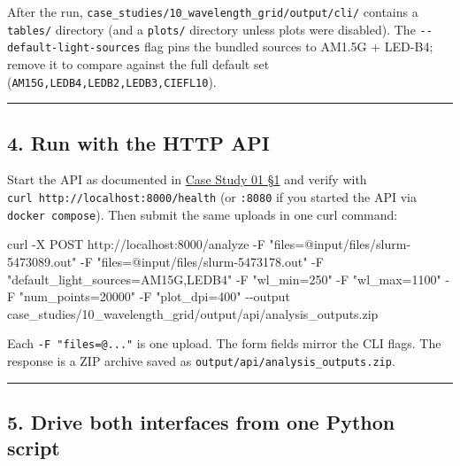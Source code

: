 \documentclass[
  11pt,
]{article}
\newenvironment{Shaded}{}{}
\newcommand{\AttributeTok}[1]{\textcolor[rgb]{0.49,0.56,0.16}{#1}}
\newcommand{\ExtensionTok}[1]{#1}
\newcommand{\NormalTok}[1]{#1}
\newcommand{\StringTok}[1]{\textcolor[rgb]{0.25,0.44,0.63}{#1}}
\begin{document}
After the run, \texttt{case\_studies/10\_wavelength\_grid/output/cli/}
contains a \texttt{tables/} directory (and a \texttt{plots/} directory
unless plots were disabled). The \texttt{-\/-default-light-sources} flag
pins the bundled sources to AM1.5G + LED-B4; remove it to compare
against the full default set (\texttt{AM15G,LEDB4,LEDB2,LEDB3,CIEFL10}).

\begin{center}\rule{0.5\linewidth}{0.5pt}\end{center}

\hypertarget{4-run-with-the-http-api}{
\subsection{4. Run with the HTTP API}\label{4-run-with-the-http-api}}

Start the API as documented in
\href{https://github.com/pinarsyt/overlap-calculator/blob/main/case_studies/01_theoretical_only/README.md\#1-prerequisites}{Case
Study 01 §1} and verify with
\texttt{curl\ http://localhost:8000/health} (or \texttt{:8080} if you
started the API via \texttt{docker\ compose}). Then submit the same
uploads in one curl command:

\begin{Shaded}
\begin{Highlighting}[]
\ExtensionTok{curl} \AttributeTok{{-}X}\NormalTok{ POST http://localhost:8000/analyze }\AttributeTok{{-}F} \StringTok{"files=@input/files/slurm{-}5473089.out"} \AttributeTok{{-}F} \StringTok{"files=@input/files/slurm{-}5473178.out"} \AttributeTok{{-}F} \StringTok{"default\_light\_sources=AM15G,LEDB4"} \AttributeTok{{-}F} \StringTok{"wl\_min=250"} \AttributeTok{{-}F} \StringTok{"wl\_max=1100"} \AttributeTok{{-}F} \StringTok{"num\_points=20000"} \AttributeTok{{-}F} \StringTok{"plot\_dpi=400"} \AttributeTok{{-}{-}output}\NormalTok{ case\_studies/10\_wavelength\_grid/output/api/analysis\_outputs.zip}
\end{Highlighting}
\end{Shaded}

Each \texttt{-F\ "files=@..."} is one upload. The form fields mirror the
CLI flags. The response is a ZIP archive saved as
\texttt{output/api/analysis\_outputs.zip}.

\begin{center}\rule{0.5\linewidth}{0.5pt}\end{center}

\hypertarget{5-drive-both-interfaces-from-one-python-script}{
\subsection{5. Drive both interfaces from one Python
script}\label{5-drive-both-interfaces-from-one-python-script}}
\end{document}
